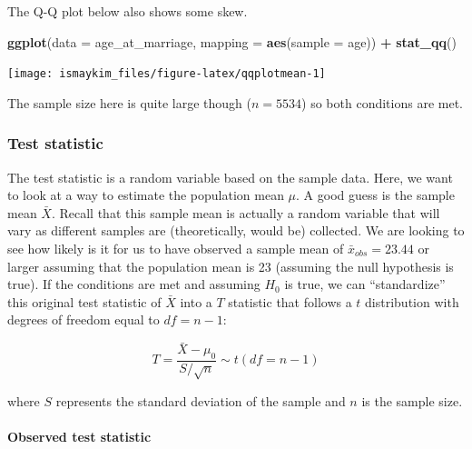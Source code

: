 \documentclass[12pt, krantz2,]{krantz}
\makeatletter
\newenvironment{Shaded}{\begin{snugshade}}{\end{snugshade}}
\newcommand{\DataTypeTok}[1]{\textcolor[rgb]{0.27,0.27,0.27}{#1}}
\newcommand{\KeywordTok}[1]{\textcolor[rgb]{0.27,0.27,0.27}{\textbf{#1}}}
\newcommand{\NormalTok}[1]{#1}
\newcommand{\OperatorTok}[1]{\textcolor[rgb]{0.43,0.43,0.43}{\textbf{#1}}}
\newcommand{\StringTok}[1]{\textcolor[rgb]{0.5,0.5,0.5}{#1}}
\let\oldparagraph\paragraph
\renewcommand{\paragraph}[1]{\oldparagraph{#1}\mbox{}}
\newenvironment{kframe}{%
\medskip{}
\setlength{\fboxsep}{.8em}
 \def\at@end@of@kframe{}%
 \ifinner\ifhmode%
  \def\at@end@of@kframe{\end{minipage}}%
  \begin{minipage}{\columnwidth}%
 \fi\fi%
 \def\FrameCommand##1{\hskip\@totalleftmargin \hskip-\fboxsep
 \colorbox{shadecolor}{##1}\hskip-\fboxsep
     \hskip-\linewidth \hskip-\@totalleftmargin \hskip\columnwidth}%
 \MakeFramed {\advance\hsize-\width
   \@totalleftmargin\z@ \linewidth\hsize
   \@setminipage}}%
 {\par\unskip\endMakeFramed%
 \at@end@of@kframe}
\renewenvironment{Shaded}{\begin{kframe}}{\end{kframe}}
\makeatother
\begin{document}
The Q-Q plot below also shows some skew.

\begin{Shaded}
\begin{Highlighting}[]
\KeywordTok{ggplot}\NormalTok{(}\DataTypeTok{data =}\NormalTok{ age_at_marriage, }\DataTypeTok{mapping =} \KeywordTok{aes}\NormalTok{(}\DataTypeTok{sample =}\NormalTok{ age)) }\OperatorTok{+}
\StringTok{  }\KeywordTok{stat_qq}\NormalTok{()}
\end{Highlighting}
\end{Shaded}

\begin{center}\texttt{[image: ismaykim\_files/figure-latex/qqplotmean-1]} \end{center}

The sample size here is quite large though (\(n = 5534\)) so both conditions are met.

\hypertarget{test-statistic}{%
\subsubsection*{Test statistic}\label{test-statistic}}


The test statistic is a random variable based on the sample data. Here, we want to look at a way to estimate the population mean \(\mu\). A good guess is the sample mean \(\bar{X}\). Recall that this sample mean is actually a random variable that will vary as different samples are (theoretically, would be) collected. We are looking to see how likely is it for us to have observed a sample mean of \(\bar{x}_{obs} = 23.44\) or larger assuming that the population mean is 23 (assuming the null hypothesis is true). If the conditions are met and assuming \(H_0\) is true, we can ``standardize'' this original test statistic of \(\bar{X}\) into a \(T\) statistic that follows a \(t\) distribution with degrees of freedom equal to \(df = n - 1\):

\[ T =\dfrac{ \bar{X} - \mu_0}{ S / \sqrt{n} } \sim t (df = n - 1) \]

where \(S\) represents the standard deviation of the sample and \(n\) is the sample size.

\hypertarget{observed-test-statistic}{%
\paragraph{Observed test statistic}\label{observed-test-statistic}}
\end{document}
